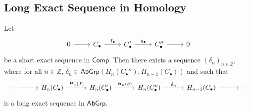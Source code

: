 \subsection*{Long Exact Sequence in Homology}
\begin{theorem}
	Let
	\begin{equation*}
		\begin{tikzcd}
			0 \arrow[r] & C_\bullet \arrow[r,"f_\bullet"] & C'_\bullet \arrow[r,"g_\bullet"] & C_\bullet'' \arrow[r] & 0
		\end{tikzcd}
	\end{equation*}
	\noindent be a short exact sequence in $\mathsf{Comp}$. Then there exists a sequence $(\delta_n)_{n \in \mathbb{Z}}$, where for all $n \in \mathbb{Z}$, $\delta_n \in \mathsf{AbGrp}(H_n(C_\bullet''),H_{n - 1}(C_\bullet))$ and such that
	\begin{equation*}
		\begin{tikzcd}[column sep=7ex]
			\cdots \arrow[r] & H_n(C_\bullet) \arrow[r,"H_n(f)"] & H_n(C'_\bullet) \arrow[r,"H_n(g)"] & H_n(C''_\bullet) \arrow[r,"\delta_n"] & H_{n - 1}(C_\bullet) \arrow[r] & \cdots
		\end{tikzcd} 
	\end{equation*}
	\noindent is a long exact sequence in $\mathsf{AbGrp}$.
	\label{thm:les_homology}
\end{theorem}

